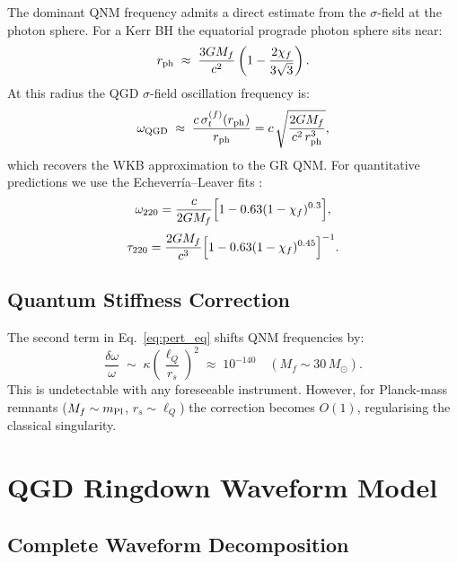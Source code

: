 \documentclass[11pt,a4paper]{article}
\theoremstyle{definition}
\theoremstyle{remark}
\newcommand{\sig}[2]{\sigma_{#1}^{(#2)}}
\newcommand{\lQ}{\ell_{Q}}
\begin{document}
	The dominant QNM frequency admits a direct estimate from the $\sigma$-field
	at the photon sphere.  For a Kerr BH the equatorial prograde photon
	sphere sits near:
	\begin{equation}
		r_{\rm ph}
		\;\approx\; \frac{3GM_f}{c^2}
		\left(1 - \frac{2\chi_f}{3\sqrt{3}}\right).
		\label{eq:r_photon}
	\end{equation}
	At this radius the QGD $\sigma$-field oscillation frequency is:
	\begin{equation}
		\omega_{\rm QGD}
		\;\approx\;
		\frac{c\,\sig{t}{f}(r_{\rm ph})}{r_{\rm ph}}
		= c\,\sqrt{\frac{2GM_f}{c^2\,r_{\rm ph}^3}},
		\label{eq:omega_qgd}
	\end{equation}
	which recovers the WKB approximation to the GR QNM.  For quantitative
	predictions we use the Echeverr\'ia--Leaver fits \cite{Echeverria1989}:
	\begin{equation}
		\omega_{220}
		= \frac{c}{2GM_f}\Bigl[1 - 0.63(1-\chi_f)^{0.3}\Bigr],
		\label{eq:omega_220}
	\end{equation}
	\begin{equation}
		\tau_{220}
		= \frac{2GM_f}{c^3}\Bigl[1-0.63(1-\chi_f)^{0.45}\Bigr]^{-1}.
		\label{eq:tau_220}
	\end{equation}
	
	\subsection{Quantum Stiffness Correction}
	
	The second term in Eq.~\eqref{eq:pert_eq} shifts QNM frequencies by:
	\begin{equation}
		\frac{\delta\omega}{\omega}
		\;\sim\; \kappa\!\left(\frac{\lQ}{r_s}\right)^{\!2}
		\;\approx\;10^{-140} \quad (M_f\sim30\,M_\odot).
		\label{eq:stiffness_correction}
	\end{equation}
	This is undetectable with any foreseeable instrument.  However, for
	Planck-mass remnants ($M_f\sim m_{\rm Pl}$, $r_s\sim\lQ$) the
	correction becomes $O(1)$, regularising the classical singularity.
	
	\section{QGD Ringdown Waveform Model}
	\label{sec:waveform}
	
	\subsection{Complete Waveform Decomposition}
	
\end{document}
